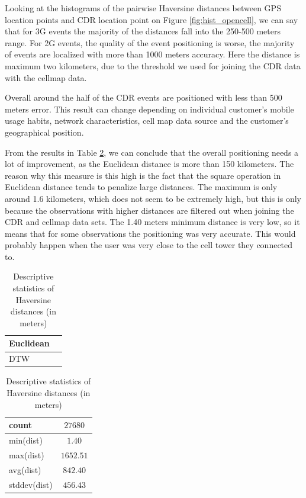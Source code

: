 Looking at the histograms of the pairwise Haversine distances between GPS location points and CDR location point on Figure \ref{fig:hist_opencell}, we can say that for 3G events the majority of the distances fall into the 250-500 meters range. For 2G events, the quality of the event positioning is worse, the majority of events are localized with more than 1000 meters accuracy. Here the distance is maximum two kilometers, due to the threshold we used for joining the CDR data with the cellmap data.

Overall around the half of the CDR events are positioned with less than 500 meters error. This result can change depending on individual customer's mobile usage habits, network characteristics, cell map data source and the customer's geographical position.

From the results in Table \ref{tab:dist_stats}, we can conclude that the overall positioning needs a lot of improvement, as the Euclidean distance is more than 150 kilometers. The reason why this measure is this high is the fact that the square operation in Euclidean distance tends to penalize large distances. The maximum is only around 1.6 kilometers, which does not seem to be extremely high, but this is only because the observations with higher distances are filtered out when joining the CDR and cellmap data sets. 
The 1.40 meters minimum distance is very low, so it means that for some observations the positioning was very accurate. This would probably happen when the user was very close to the cell tower they connected to. 

\begin{table}[h]
    \centering
    \begin{tabular}{|l|c|}
        \hline 
        Euclidean &  \\
        \hline
        DTW &  \\
        \hline
    \end{tabular}
    \caption{Descriptive statistics of Haversine distances (in meters)}
    \label{tab:distances}
\end{table}

\begin{table}[h]
    \centering
    \begin{tabular}{|l|c|}
        \hline 
        count & $27680$ \\
        \hline
        min(dist) &  $1.40$\\
        \hline
        max(dist) &   $1652.51$\\
        \hline
        avg(dist) &  $842.40$\\
        \hline
        stddev(dist) &  $456.43$\\
        \hline
    \end{tabular}
    \caption{Descriptive statistics of Haversine distances (in meters)}
    \label{tab:dist_stats}
\end{table}

